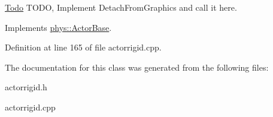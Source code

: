 \begin{Desc}
\item[\hyperlink{todo__todo000001}{Todo}]TODO, Implement DetachFromGraphics and call it here. \end{Desc}




Implements \hyperlink{classphys_1_1ActorBase_af669724f10d0bf74f4951c85caa42494}{phys::ActorBase}.



Definition at line 165 of file actorrigid.cpp.



The documentation for this class was generated from the following files:\begin{DoxyCompactItemize}
\item 
actorrigid.h\item 
actorrigid.cpp\end{DoxyCompactItemize}
